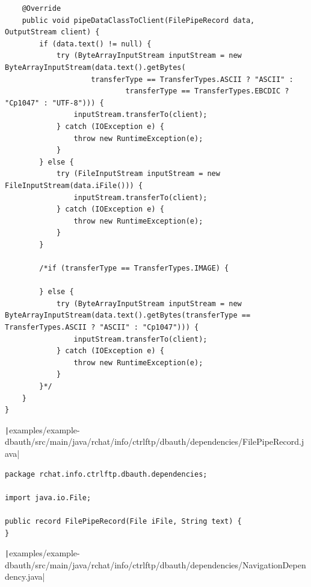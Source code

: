 \documentclass[a4paper,14pt]{extarticle}
\begin{document}
\begin{verbatim}
    @Override
    public void pipeDataClassToClient(FilePipeRecord data, OutputStream client) {
        if (data.text() != null) {
            try (ByteArrayInputStream inputStream = new ByteArrayInputStream(data.text().getBytes(
                    transferType == TransferTypes.ASCII ? "ASCII" :
                            transferType == TransferTypes.EBCDIC ? "Cp1047" : "UTF-8"))) {
                inputStream.transferTo(client);
            } catch (IOException e) {
                throw new RuntimeException(e);
            }
        } else {
            try (FileInputStream inputStream = new FileInputStream(data.iFile())) {
                inputStream.transferTo(client);
            } catch (IOException e) {
                throw new RuntimeException(e);
            }
        }

        /*if (transferType == TransferTypes.IMAGE) {

        } else {
            try (ByteArrayInputStream inputStream = new ByteArrayInputStream(data.text().getBytes(transferType == TransferTypes.ASCII ? "ASCII" : "Cp1047"))) {
                inputStream.transferTo(client);
            } catch (IOException e) {
                throw new RuntimeException(e);
            }
        }*/
    }
}
\end{verbatim}
\texttt|examples/example-dbauth/src/main/java/rchat/info/ctrlftp/dbauth/dependencies/FilePipeRecord.java|
\begin{verbatim}
package rchat.info.ctrlftp.dbauth.dependencies;

import java.io.File;

public record FilePipeRecord(File iFile, String text) {
}
\end{verbatim}
\texttt|examples/example-dbauth/src/main/java/rchat/info/ctrlftp/dbauth/dependencies/NavigationDependency.java|
\end{document}
